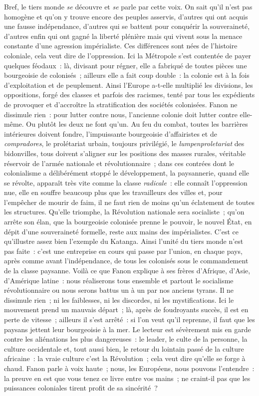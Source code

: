 \documentclass[french,twoside]{book} %
\begin{document}
 Bref, le tiers monde \emph{se} découvre et \emph{se} parle par cette voix. On sait qu’il n’est pas homogène et qu’on y trouve encore des peuples asservis, d’autres qui ont acquis une fausse indépendance, d’autres qui se battent pour conquérir la souveraineté, d’autres enfin qui ont gagné la liberté plénière mais qui vivent sous la menace constante d’une agression impérialiste. Ces différences sont nées de l’histoire coloniale, cela veut dire de l’oppression. Ici la Métropole s’est contentée de payer quelques féodaux : là, divisant pour régner, elle a fabriqué de toutes pièces une bourgeoisie de colonisés ; ailleurs elle a fait coup double : la colonie est à la fois d’exploitation et de peuplement. Ainsi l’Europe a-t-elle multiplié les divisions, les oppositions, forgé des classes et parfois des racismes, tenté par tous les expédients de provoquer et d’accroître la stratification des sociétés colonisées. Fanon ne dissimule rien : pour lutter contre nous, l’ancienne colonie doit lutter contre elle-même. Ou plutôt les deux ne font qu’un. Au feu du combat, toutes les barrières intérieures doivent fondre, l’impuissante bourgeoisie d’affairistes et de \emph{compradores}, le prolétariat urbain, toujours privilégié, le \emph{lumpenproletariat} des bidonvilles, tous doivent s’aligner sur les positions des masses rurales, véritable réservoir de l’armée nationale et révolutionnaire ; dans ces contrées dont le colonialisme a délibérément stoppé le développement, la paysannerie, quand elle se révolte, apparaît très vite comme la classe \emph{radicale} : elle connaît l’oppression nue, elle en souffre beaucoup plus que les travailleurs des villes et, pour l’empêcher de mourir de faim, il ne faut rien de moins qu’un éclatement de toutes les structures. Qu’elle triomphe, la Révolution nationale sera socialiste ; qu’on arrête son élan, que la bourgeoisie colonisée prenne le pouvoir, le nouvel État, en dépit d’une souveraineté formelle, reste aux mains des impérialistes. C’est ce qu’illustre assez bien l’exemple du Katanga. Ainsi l’unité du tiers monde n’est pas faite : c’est une entreprise en cours qui passe par l’union, en chaque pays, après comme avant l’indépendance, de tous les colonisés sous le commandement de la classe paysanne. Voilà ce que Fanon explique à ses frères d’Afrique, d’Asie,   d’Amérique latine : nous réaliserons tous ensemble et partout le socialisme révolutionnaire ou nous serons battus un à un par nos anciens tyrans. Il ne dissimule rien ; ni les faiblesses, ni les discordes, ni les mystifications. Ici le mouvement prend un mauvais départ ; là, après de foudroyants succès, il est en perte de vitesse ; ailleurs il s’est arrêté : si l’on veut qu’il reprenne, il faut que les paysans jettent leur bourgeoisie à la mer. Le lecteur est sévèrement mis en garde contre les aliénations les plus dangereuses : le leader, le culte de la personne, la culture occidentale et, tout aussi bien, le retour du lointain passé de la culture africaine : la vraie culture c’est la Révolution ; cela veut dire qu’elle se forge à chaud. Fanon parle à voix haute ; nous, les Européens, nous pouvons l’entendre : la preuve en est que vous tenez ce livre entre vos mains ; ne craint-il pas que les puissances coloniales tirent profit de sa sincérité ?\par
\end{document}
